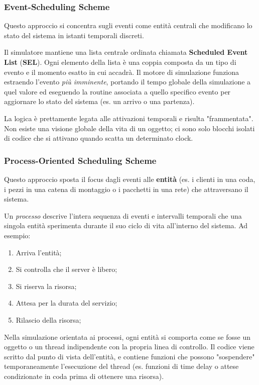 \subsubsection{Event-Scheduling Scheme}
Questo approccio si concentra sugli eventi come entità centrali che modificano lo stato del sistema in istanti temporali discreti.

Il simulatore mantiene una lista centrale ordinata chiamata \textbf{Scheduled Event List} (\textbf{SEL}). Ogni elemento della lista è una coppia composta da un tipo di evento e il momento esatto in cui accadrà. Il motore di simulazione funziona estraendo l'evento \textit{più imminente}, portando il tempo globale della simulazione a quel valore ed eseguendo la routine associata a quello specifico evento per aggiornare lo stato del sistema (es. un arrivo o una partenza).

La logica è prettamente legata alle attivazioni temporali e risulta "frammentata". Non esiste una visione globale della vita di un oggetto; ci sono solo blocchi isolati di codice che si attivano quando scatta un determinato clock.

\subsubsection{Process-Oriented Scheduling Scheme}
Questo approccio sposta il focus dagli eventi alle \textbf{entità} (es. i clienti in una coda, i pezzi in una catena di montaggio o i pacchetti in una rete) che attraversano il sistema.

Un \textit{processo} descrive l'intera sequenza di eventi e intervalli temporali che una singola entità sperimenta durante il suo ciclo di vita all'interno del sistema. Ad esempio:
\begin{enumerate}
	\item Arriva l'entità;
	\item Si controlla che il server è libero;
	\item Si riserva la risorsa;
	\item Attesa per la durata del servizio;
	\item Rilascio della risorsa;
\end{enumerate}

Nella simulazione orientata ai processi, ogni entità si comporta come se fosse un oggetto o un thread indipendente con la propria linea di controllo. Il codice viene scritto dal punto di vista dell'entità, e contiene funzioni che possono "sospendere" temporaneamente l'esecuzione del thread (es. funzioni di time delay o attese condizionate in coda prima di ottenere una risorsa).

